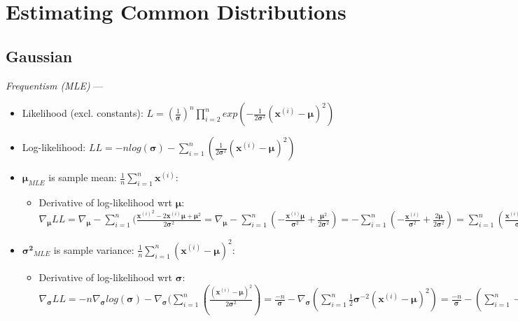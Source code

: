 \section{Estimating Common Distributions}
\subsection*{Gaussian}
\emph{Frequentism (MLE)} --- 
\begin{itemize}
    \item Likelihood (excl. constants): $L = (\frac{1}{\boldsymbol{\sigma}})^n \prod_{i=2}^n exp( -\frac{1}{2\boldsymbol{\sigma}^2} (\boldsymbol{x}^{(i)} - \boldsymbol{\mu} )^2)$
    \item Log-likelihood: $LL = -n log(\boldsymbol{\sigma}) - \sum_{i=1}^n (\frac{1}{2\boldsymbol{\sigma}^2} (\boldsymbol{x}^{(i)} - \boldsymbol{\mu} )^2)$
    \item $\boldsymbol{\mu}_{MLE}$ is sample mean: $ \frac{1}{n}\sum_{i=1}^n \boldsymbol{x}^{(i)}$:
    \begin{itemize}
        \item Derivative of log-likelihood wrt $\boldsymbol{\mu}$: $\nabla_{\boldsymbol{\mu}} LL = \nabla_{\boldsymbol{\mu}} - \sum_{i=1}^n (\frac{{\boldsymbol{x}^{(i)}}^2 - 2 \boldsymbol{x}^{(i)} \boldsymbol{\mu} + \boldsymbol{\mu}^2}{2\boldsymbol{\sigma}^2} = \nabla_{\boldsymbol{\mu}} - \sum_{i=1}^n (-\frac{ \boldsymbol{x}^{(i)} \boldsymbol{\mu}}{\boldsymbol{\sigma}^2} + \frac{ \boldsymbol{\mu}^2}{2\boldsymbol{\sigma}^2} ) = - \sum_{i=1}^n (-\frac{ \boldsymbol{x}^{(i)}}{\boldsymbol{\sigma}^2} + \frac{ 2\boldsymbol{\mu}}{2\boldsymbol{\sigma}^2} ) =  \sum_{i=1}^n (\frac{ \boldsymbol{x}^{(i)} - \boldsymbol{\mu}}{\boldsymbol{\sigma}^2}) = \sum_{i=1}^n \boldsymbol{x}^{(i)} - n\boldsymbol{\mu} = 0 $
    \end{itemize}
    \item $\boldsymbol{\sigma^2}_{MLE}$ is sample variance: $ \frac{1}{n}\sum_{i=1}^n (\boldsymbol{x}^{(i)} - \boldsymbol{\mu})^2$:
    \begin{itemize}
        \item Derivative of log-likelihood wrt $\boldsymbol{\sigma}$: $\nabla_{\boldsymbol{\sigma}} LL = 
        -n \nabla_{\boldsymbol{\sigma}} log(\boldsymbol{\sigma}) -
        \nabla_{\boldsymbol{\sigma}} (\sum_{i=1}^n (\frac{(\boldsymbol{x}^{(i)} - \boldsymbol{\mu} )^2}{2\boldsymbol{\sigma}^2}) =
        \frac{-n}{\boldsymbol{\sigma}} - \nabla_{\boldsymbol{\sigma}} (\sum_{i=1}^n \frac{1}{2} \boldsymbol{\sigma}^{-2} (\boldsymbol{x}^{(i)} - \boldsymbol{\mu} )^2) = \frac{-n}{\boldsymbol{\sigma}} - (\sum_{i=1}^n -1 \boldsymbol{\sigma}^{-3} (\boldsymbol{x}^{(i)} - \boldsymbol{\mu} )^2) = -n + \sum_{i=1}^n (\frac{ (\boldsymbol{x}^{(i)} - \boldsymbol{\mu} )^2 }{ \boldsymbol{\sigma}^{2} })
        = 0 $
    \end{itemize}
\end{itemize}

